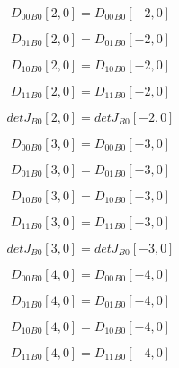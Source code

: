 \documentclass{article}
\begin{document}
\begin{dmath}{D_{00}{_{B0}}}[{2,0}] = {D_{00}{_{B0}}}[{-2,0}]\end{dmath}

\begin{dmath}{D_{01}{_{B0}}}[{2,0}] = {D_{01}{_{B0}}}[{-2,0}]\end{dmath}

\begin{dmath}{D_{10}{_{B0}}}[{2,0}] = {D_{10}{_{B0}}}[{-2,0}]\end{dmath}

\begin{dmath}{D_{11}{_{B0}}}[{2,0}] = {D_{11}{_{B0}}}[{-2,0}]\end{dmath}

\begin{dmath}{detJ{_{B0}}}[{2,0}] = {detJ{_{B0}}}[{-2,0}]\end{dmath}

\begin{dmath}{D_{00}{_{B0}}}[{3,0}] = {D_{00}{_{B0}}}[{-3,0}]\end{dmath}

\begin{dmath}{D_{01}{_{B0}}}[{3,0}] = {D_{01}{_{B0}}}[{-3,0}]\end{dmath}

\begin{dmath}{D_{10}{_{B0}}}[{3,0}] = {D_{10}{_{B0}}}[{-3,0}]\end{dmath}

\begin{dmath}{D_{11}{_{B0}}}[{3,0}] = {D_{11}{_{B0}}}[{-3,0}]\end{dmath}

\begin{dmath}{detJ{_{B0}}}[{3,0}] = {detJ{_{B0}}}[{-3,0}]\end{dmath}

\begin{dmath}{D_{00}{_{B0}}}[{4,0}] = {D_{00}{_{B0}}}[{-4,0}]\end{dmath}

\begin{dmath}{D_{01}{_{B0}}}[{4,0}] = {D_{01}{_{B0}}}[{-4,0}]\end{dmath}

\begin{dmath}{D_{10}{_{B0}}}[{4,0}] = {D_{10}{_{B0}}}[{-4,0}]\end{dmath}

\begin{dmath}{D_{11}{_{B0}}}[{4,0}] = {D_{11}{_{B0}}}[{-4,0}]\end{dmath}
\end{document}
